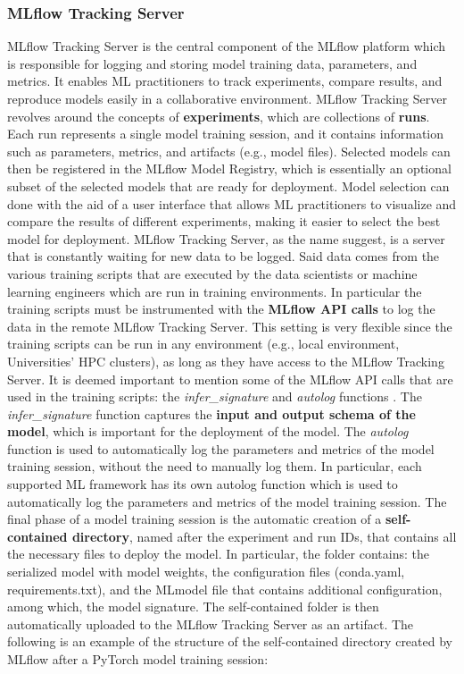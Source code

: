 \subsubsection{MLflow Tracking Server}
\label{sec:mlflow_tracking_server}

MLflow Tracking Server is the central component of the MLflow platform which is responsible for logging and storing model training data, parameters, and metrics. 
It enables ML practitioners to track experiments, compare results, and reproduce models easily in a collaborative environment.
MLflow Tracking Server revolves around the concepts of \textbf{experiments}, which are collections of \textbf{runs}. 
Each run represents a single model training session, and it contains information such as parameters, metrics, and artifacts (e.g., model files).
Selected models can then be registered in the MLflow Model Registry, which is essentially an optional subset of the selected models that are ready for deployment.
Model selection can done with the aid of a user interface that allows ML practitioners to visualize and compare the results of different experiments, making it easier to select the best model for deployment.
MLflow Tracking Server, as the name suggest, is a server that is constantly waiting for new data to be logged. 
Said data comes from the various training scripts that are executed by the data scientists or machine learning engineers which are run in  training environments.
In particular the training scripts must be instrumented with the \textbf{MLflow API calls} to log the data in the remote MLflow Tracking Server.
This setting is very flexible since the training scripts can be run in any environment (e.g., local environment, Universities' HPC clusters), as long as they have access to the MLflow Tracking Server.
It is deemed important to mention some of the MLflow API calls that are used in the training scripts: the \textit{infer\_signature} and \textit{autolog} functions \cite{mlflow_docs}.
The \textit{infer\_signature} function captures the \textbf{input and output schema of the model}, which is important for the deployment of the model.
The \textit{autolog} function is used to automatically log the parameters and metrics of the model training session, without the need to manually log them. In particular, each supported ML framework has its own autolog function which is used to automatically log the parameters and metrics of the model training session.
The final phase of a model training session is the automatic creation of a \textbf{self-contained directory}, named after the experiment and run IDs, that contains all the necessary files to deploy the model. 
In particular, the folder contains: the serialized model with model weights, the configuration files (conda.yaml, requirements.txt), and the MLmodel file that contains additional configuration, among which, the model signature.
The self-contained folder is then automatically uploaded to the MLflow Tracking Server as an artifact.
The following is an example of the structure of the self-contained directory created by MLflow after a PyTorch model training session: \\


